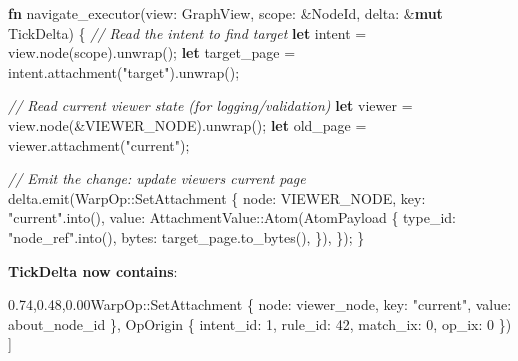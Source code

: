 \documentclass[
]{book}
\newenvironment{Shaded}{}{}
\newcommand{\CommentTok}[1]{\textcolor[rgb]{0.38,0.63,0.69}{\textit{#1}}}
\newcommand{\DecValTok}[1]{\textcolor[rgb]{0.25,0.63,0.44}{#1}}
\newcommand{\KeywordTok}[1]{\textcolor[rgb]{0.00,0.44,0.13}{\textbf{#1}}}
\newcommand{\NormalTok}[1]{#1}
\newcommand{\OperatorTok}[1]{\textcolor[rgb]{0.40,0.40,0.40}{#1}}
\newcommand{\PreprocessorTok}[1]{\textcolor[rgb]{0.74,0.48,0.00}{#1}}
\newcommand{\StringTok}[1]{\textcolor[rgb]{0.25,0.44,0.63}{#1}}
\begin{document}
\begin{Shaded}
\begin{Highlighting}[]
\KeywordTok{fn}\NormalTok{ navigate\_executor(view}\OperatorTok{:}\NormalTok{ GraphView}\OperatorTok{,}\NormalTok{ scope}\OperatorTok{:} \OperatorTok{\&}\NormalTok{NodeId}\OperatorTok{,}\NormalTok{ delta}\OperatorTok{:} \OperatorTok{\&}\KeywordTok{mut}\NormalTok{ TickDelta) }\OperatorTok{\{}
    \CommentTok{// Read the intent to find target}
    \KeywordTok{let}\NormalTok{ intent }\OperatorTok{=}\NormalTok{ view}\OperatorTok{.}\NormalTok{node(scope)}\OperatorTok{.}\NormalTok{unwrap()}\OperatorTok{;}
    \KeywordTok{let}\NormalTok{ target\_page }\OperatorTok{=}\NormalTok{ intent}\OperatorTok{.}\NormalTok{attachment(}\StringTok{"target"}\NormalTok{)}\OperatorTok{.}\NormalTok{unwrap()}\OperatorTok{;}

    \CommentTok{// Read current viewer state (for logging/validation)}
    \KeywordTok{let}\NormalTok{ viewer }\OperatorTok{=}\NormalTok{ view}\OperatorTok{.}\NormalTok{node(}\OperatorTok{\&}\NormalTok{VIEWER\_NODE)}\OperatorTok{.}\NormalTok{unwrap()}\OperatorTok{;}
    \KeywordTok{let}\NormalTok{ old\_page }\OperatorTok{=}\NormalTok{ viewer}\OperatorTok{.}\NormalTok{attachment(}\StringTok{"current"}\NormalTok{)}\OperatorTok{;}

    \CommentTok{// Emit the change: update viewer\textquotesingle{}s current page}
\NormalTok{    delta}\OperatorTok{.}\NormalTok{emit(}\PreprocessorTok{WarpOp::}\NormalTok{SetAttachment }\OperatorTok{\{}
\NormalTok{        node}\OperatorTok{:}\NormalTok{ VIEWER\_NODE}\OperatorTok{,}
\NormalTok{        key}\OperatorTok{:} \StringTok{"current"}\OperatorTok{.}\NormalTok{into()}\OperatorTok{,}
\NormalTok{        value}\OperatorTok{:} \PreprocessorTok{AttachmentValue::}\NormalTok{Atom(AtomPayload }\OperatorTok{\{}
\NormalTok{            type\_id}\OperatorTok{:} \StringTok{"node\_ref"}\OperatorTok{.}\NormalTok{into()}\OperatorTok{,}
\NormalTok{            bytes}\OperatorTok{:}\NormalTok{ target\_page}\OperatorTok{.}\NormalTok{to\_bytes()}\OperatorTok{,}
        \OperatorTok{\}}\NormalTok{)}\OperatorTok{,}
    \OperatorTok{\}}\NormalTok{)}\OperatorTok{;}
\OperatorTok{\}}
\end{Highlighting}
\end{Shaded}

\textbf{TickDelta now contains}:

\begin{Shaded}
\begin{Highlighting}[]
\NormalTok{[}
\NormalTok{    (}\PreprocessorTok{WarpOp::}\NormalTok{SetAttachment }\OperatorTok{\{}
\NormalTok{        node}\OperatorTok{:}\NormalTok{ viewer\_node}\OperatorTok{,}
\NormalTok{        key}\OperatorTok{:} \StringTok{"current"}\OperatorTok{,}
\NormalTok{        value}\OperatorTok{:}\NormalTok{ about\_node\_id}
    \OperatorTok{\},}\NormalTok{ OpOrigin }\OperatorTok{\{}\NormalTok{ intent\_id}\OperatorTok{:} \DecValTok{1}\OperatorTok{,}\NormalTok{ rule\_id}\OperatorTok{:} \DecValTok{42}\OperatorTok{,}\NormalTok{ match\_ix}\OperatorTok{:} \DecValTok{0}\OperatorTok{,}\NormalTok{ op\_ix}\OperatorTok{:} \DecValTok{0} \OperatorTok{\}}\NormalTok{)}
\NormalTok{]}
\end{Highlighting}
\end{Shaded}
\end{document}
